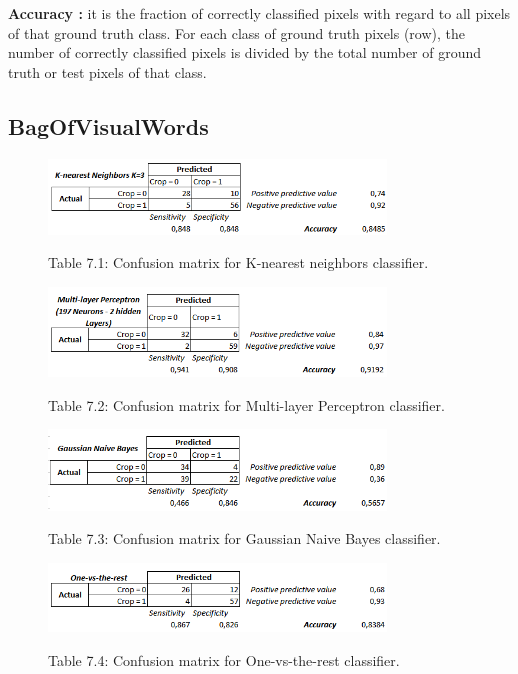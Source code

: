 \documentclass[12pt]{article}
\numberwithin{equation}{section}
\numberwithin{table}{section}
\numberwithin{figure}{section}
\begin{document}
\noindent
\textbf{Accuracy : }it is the fraction of correctly classified pixels with regard to all pixels of that ground truth class. For each class of ground truth pixels (row), the number of correctly classified pixels is divided by the total number of ground truth or test pixels of that class. 


\subsection{BagOfVisualWords}

\begin{figure}[H] \centering
	\caption*{Table 7.1: Confusion matrix for K-nearest neighbors classifier. }
	\includegraphics[width=0.8\textwidth]{m1.png}
	\label{m1}
\end{figure}

\begin{figure}[H] \centering
	\caption*{Table 7.2: Confusion matrix for Multi-layer Perceptron classifier. }
	\includegraphics[width=0.8\textwidth]{m2.png}
	\label{m2}
\end{figure}

\begin{figure}[H] \centering
	\caption*{Table 7.3: Confusion matrix for Gaussian Naive Bayes classifier. }
	\includegraphics[width=0.8\textwidth]{m3.png}
	\label{m3}
\end{figure}

\begin{figure}[H] \centering
	\caption*{Table 7.4: Confusion matrix for One-vs-the-rest classifier. }
	\includegraphics[width=0.8\textwidth]{m4.png}
	\label{m4}
\end{figure}
\end{document}

